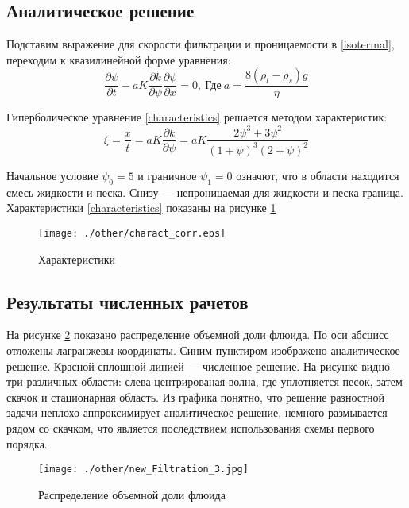 \documentclass[12pt,a4paper]{article}
\newcommand{\pd}[2]{\frac{\partial #1}{\partial #2}}
\begin{document}
\subsection{Аналитическое решение}
Подставим выражение для скорости фильтрации и проницаемости в \eqref{isotermal}, переходим к квазилинейной форме уравнения:
\begin{equation}
\pd{\psi}{t} - a K \pd{k}{\psi} \pd{\psi}{x} = 0,\  \text{Где}\ a = \frac{8(\rho_l-\rho_s)g}{\eta}
\label{characteristics}
\end{equation}

Гиперболическое уравнение \eqref{characteristics} решается методом характеристик:
$$
\xi = \frac{x}{t} = a K \pd{k}{\psi} =   a K \frac{2\psi^3 + 3\psi^2}{(1 + \psi)^3(2+\psi)^2}
$$

Начальное условие $\psi_0 = 5$ и граничное $\psi_1 = 0$ означют, что в области находится смесь жидкости и песка. Снизу --- непроницаемая для жидкости и песка граница. Характеристики \eqref{characteristics} показаны на рисунке \ref{charact}
\begin{figure}[ht!]
\begin{center}
\texttt{[image: ./other/charact\_corr.eps]}
\caption{Характеристики}
\label{charact}
\end{center}
\end{figure}

\subsection{Результаты численных рачетов}
На рисунке \ref{vol_fraction} показано распределение объемной доли флюида. По оси абсцисс отложены лагранжевы координаты. Синим пунктиром изображено аналитическое решение. Красной сплошной линией --- численное решение. На рисунке видно три различных области: слева центрированая волна, где уплотняется песок, затем скачок и стационарная область. Из графика понятно, что решение разностной задачи неплохо аппроксимирует аналитическое решение, немного размывается рядом со скачком, что является последствием использования схемы первого порядка.
\begin{figure}[h!]
\begin{center}
\texttt{[image: ./other/new\_Filtration\_3.jpg]}
\caption{Распределение объемной доли флюида}
\label{vol_fraction}
\end{center}
\end{figure}
\newpage
\end{document}
